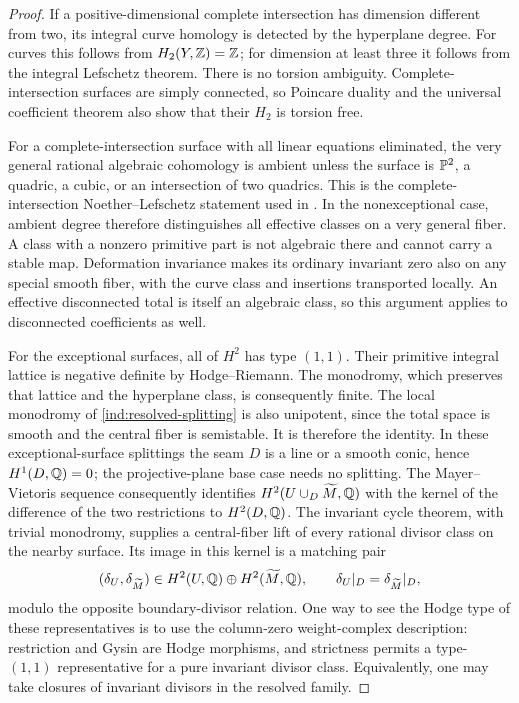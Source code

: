 \begin{proof}
If a positive-dimensional complete intersection has dimension different
from two, its integral curve homology is detected by the hyperplane
degree. For curves this follows from $H_2(Y,\mathbb Z)=\mathbb Z$; for dimension
at least three it follows from the integral Lefschetz theorem.
There is no torsion ambiguity. Complete-intersection surfaces are
simply connected, so Poincare duality and the universal coefficient
theorem also show that their $H_2$ is torsion free.

For a complete-intersection surface with all linear equations
eliminated, the very general rational algebraic cohomology is ambient
unless the surface is $\mathbb P^2$, a quadric, a cubic, or an intersection
of two quadrics. This is the complete-intersection Noether--Lefschetz
statement used in \cite[\S5.2]{ABPZ}. In the nonexceptional case,
ambient degree therefore distinguishes all effective classes on a
very general fiber. A class with a nonzero primitive part is not
algebraic there and cannot carry a stable map. Deformation invariance
makes its ordinary invariant zero also on any special smooth fiber,
with the curve class and insertions transported locally. An effective
disconnected total is itself an algebraic class, so this argument
applies to disconnected coefficients as well.

For the exceptional surfaces, all of $H^2$ has type $(1,1)$. Their
primitive integral lattice is negative definite by Hodge--Riemann.
The monodromy, which preserves that lattice and the hyperplane class,
is consequently finite. The local monodromy of
\eqref{ind:resolved-splitting} is also unipotent, since the total space
is smooth and the central fiber is semistable. It is therefore the
identity. In these exceptional-surface splittings the seam $D$ is a
line or a smooth conic, hence $H^1(D,\mathbb Q)=0$; the projective-plane base
case needs no splitting. The Mayer--Vietoris sequence consequently
identifies $H^2(U\cup_D\widetilde M,\mathbb Q)$ with the kernel of the
difference of the two restrictions to $H^2(D,\mathbb Q)$. The invariant cycle
theorem, with trivial monodromy, supplies a central-fiber lift of every
rational divisor class on the nearby surface. Its image in this
kernel is a matching pair
\begin{equation}
\label{ind:matching-divisors}
 (\delta_U,\delta_{\widetilde M})\in
 H^2(U,\mathbb Q)\oplus H^2(\widetilde M,\mathbb Q),\qquad
 \delta_U|_D=\delta_{\widetilde M}|_D,
\end{equation}
modulo the opposite boundary-divisor relation. One way to see the
Hodge type of these representatives is to use the column-zero
weight-complex description: restriction and Gysin are Hodge
morphisms, and strictness permits a type-$(1,1)$ representative for a
pure invariant divisor class. Equivalently, one may take closures of
invariant divisors in the resolved family.


\end{proof}
